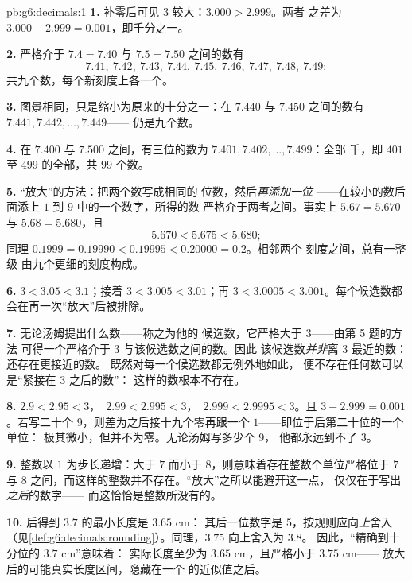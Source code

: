 \begin{solution}{pb:g6:decimals:1}
\textbf{1.} 补零后可见 $3$ 较大：$3.000 > 2.999$。两者
之差为 $3.000 - 2.999 = 0.001$，即千分之一。

\textbf{2.} 严格介于 $7.4 = 7.40$ 与 $7.5 = 7.50$ 之间的数有
\[
7.41,\ 7.42,\ 7.43,\ 7.44,\ 7.45,\ 7.46,\ 7.47,\ 7.48,\ 7.49 :
\]
共九个数，每个新刻度上各一个。

\textbf{3.} 图景相同，只是缩小为原来的十分之一：在 $7.440$
与 $7.450$ 之间的数有 $7.441, 7.442, \dots, 7.449$——
仍是九个数。

\textbf{4.} 在 $7.400$ 与 $7.500$ 之间，有三位的数为
$7.401, 7.402, \dots, 7.499$：全部
千，即 $401$ 至 $499$ 的全部，共 $99$ 个数。

\textbf{5.} “放大”的方法：把两个数写成相同的
位数，然后\emph{再添加一位}
——在较小的数后面添上 $1$ 到 $9$ 中的一个数字，所得的数
严格介于两者之间。事实上 $5.67 = 5.670$ 与
$5.68 = 5.680$，且
\[
5.670 < 5.675 < 5.680 ;
\]
同理 $0.1999 = 0.19990 < 0.19995 < 0.20000 = 0.2$。相邻两个
刻度之间，总有一整级
由九个更细的刻度构成。

\textbf{6.} $3 < 3.05 < 3.1$；接着 $3 < 3.005 < 3.01$；再
$3 < 3.0005 < 3.001$。每个候选数都会在再一次“放大”后被排除。

\textbf{7.} 无论汤姆提出什么数——称之为他的
候选数，它严格大于 $3$——由第 5 题的方法
可得一个严格介于 $3$ 与该候选数之间的数。因此
该候选数\emph{并非}离 $3$ 最近的数：还存在更接近的数。
既然对每一个候选数都无例外地如此，
便不存在任何数可以是“紧接在 $3$ 之后的数”：
这样的数根本不存在。

\textbf{8.} $2.9 < 2.95 < 3$，\ $2.99 < 2.995 < 3$，\
$2.999 < 2.9995 < 3$。且 $3 - 2.999 = 0.001$。若写二十个
9，则差为之后接十九个零再跟一个
$1$——即位于\omterm{def:g4:decimals:point}{小数点}后第二十位的一个单位：
极其微小，但并不为零。无论汤姆写多少个 9，
他都永远到不了 $3$。

\textbf{9.} 整数以 $1$ 为步长递增：大于 $7$
而小于 $8$，则意味着存在整数个单位严格位于
$7$ 与 $8$ 之间，而这样的整数并不存在。“放大”之所以能避开这一点，
仅仅在于写出\emph{之后}的数字——
而这恰恰是整数所没有的。

\textbf{10.} 后得到 $3.7$ 的最小长度是 $3.65$ cm：
其后一位数字是 $5$，按规则应向\emph{上}舍入
（见\cref{def:g6:decimals:rounding}）。同理，$3.75$ 向上舍入为 $3.8$。
因此，“精确到十分位的 $3.7$ cm”意味着：
实际长度至少为 $3.65$ cm，且严格小于 $3.75$ cm——
放大后的可能真实长度区间，隐藏在一个
的近似值之后。


\end{solution}
